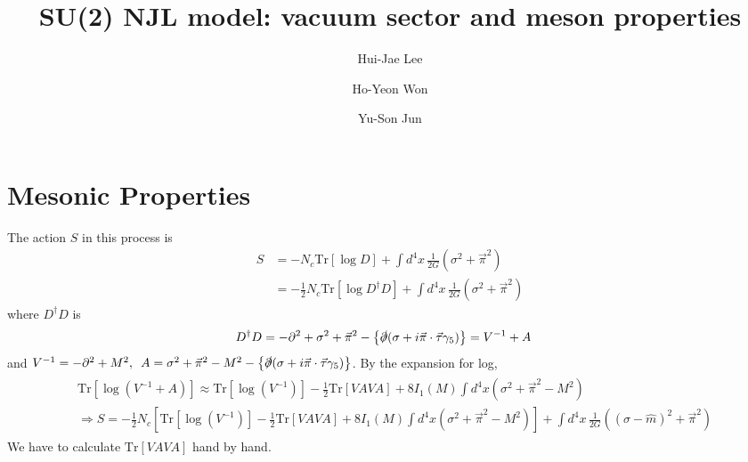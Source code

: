 \documentclass[tightenlines,floatfix,nofootinbib,superscriptaddress,fleqn]{revtex4-2}
\begin{document}
\title{\Large SU(2) NJL model: vacuum sector and meson properties}
\author{Hui-Jae Lee} 
  \author{Ho-Yeon Won}
  \author{Yu-Son Jun}
\maketitle

\section[2.4]{Mesonic Properties}

The action $S$ in this process is
\begin{align}\label{1-1}
  S &= -N_c\mathrm{Tr}\left[\log D\right]+\int d^4x\,\frac{1}{2G}\left(\sigma^2+\vec{\pi}^2\right)  \\
  &= -\frac{1}{2}N_c\mathrm{Tr}\left[\log D^\dagger D\right]
  +\int d^4x\,\frac{1}{2G}\left(\sigma^2+\vec{\pi}^2\right)
\end{align}
where $D^\dagger D$ is
\begin{align}\label{1-2}
  &D^\dagger D = -\partial^2+\sigma^2+\vec{\pi}^2
  -\left\{\slashed{\partial}(\sigma+i\vec{\pi}\cdot\vec{\tau}\gamma_5)\right\} 
  =V^{-1}+A
\end{align}
and $V^{-1}= -\partial^2+M^2,\,\,\, A=\sigma^2+\vec{\pi}^2-M^2
-\left\{\slashed{\partial}(\sigma+i\vec{\pi}\cdot\vec{\tau}\gamma_5)\right\}$.
By the expansion for log,
\begin{align}\label{1-3}
  \begin{split}
    &\mathrm{Tr}\left[\log\left(V^{-1}+A\right)\right] \approx 
    \mathrm{Tr}\left[\log\left(V^{-1}\right)\right]
    -\frac{1}{2}\mathrm{Tr}\left[VAVA\right]
    +8I_1(M)\int d^4x\left(\sigma^2+\vec{\pi}^2-M^2\right) \\
    &\Longrightarrow
    S=-\frac{1}{2}N_c\left[\mathrm{Tr}
    \left[\log\left(V^{-1}\right)\right]
    -\frac{1}{2}\mathrm{Tr}\left[VAVA\right]
    +8I_1(M)\int d^4x\left(\sigma^2+\vec{\pi}^2-M^2\right)\right]
    +\int d^4x\,\frac{1}{2G}\left(\left(\sigma-\hat{m}\right)^2+\vec{\pi}^2\right)
  \end{split}
\end{align}
We have to calculate $\mathrm{Tr}\left[VAVA\right]$ hand by hand.
\end{document}
